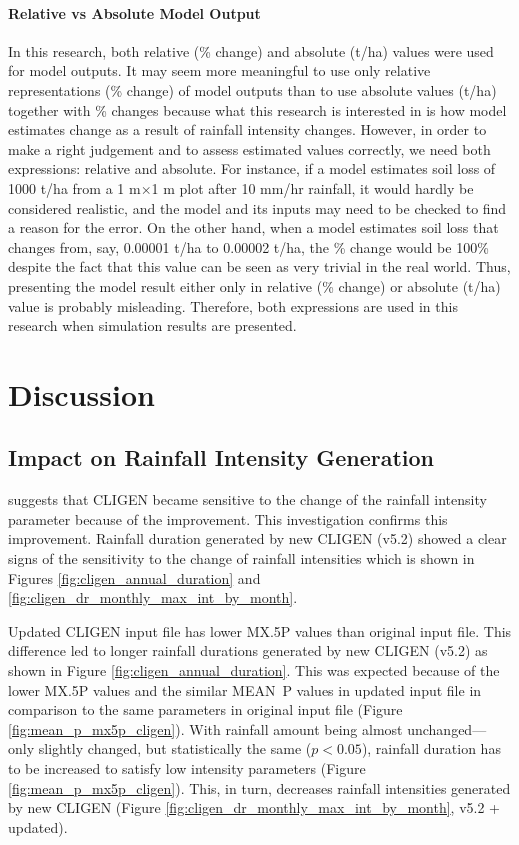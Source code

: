 \paragraph{Relative vs Absolute Model Output} In this research, both relative
(\% change) and absolute (t/ha) values were used for model outputs. It may seem
more meaningful to use only relative representations (\% change) of model
outputs than to use absolute values (t/ha) together with \% changes because what
this research is interested in is how model estimates change as a result of
rainfall intensity changes. However, in order to make a right judgement and to
assess estimated values correctly, we need both expressions: relative and
absolute. For instance, if a model estimates soil loss of 1000 t/ha from
a 1 m$\times$1 m plot after 10 mm/hr rainfall, it would hardly be considered
realistic, and the model and its inputs may need to be checked to find a reason
for the error. On the other hand, when a model estimates soil loss that changes
from, say, 0.00001 t/ha to 0.00002 t/ha, the \% change would be 100\% despite
the fact that this value can be seen as very trivial in the real world. Thus,
presenting the model result either only in relative (\% change) or absolute
(t/ha) value is probably misleading. Therefore, both expressions are used in
this research when simulation results are presented.

\section{Discussion}
\label{sec:ImprovedCLIGENDiscussion}

\subsection{Impact on Rainfall Intensity Generation}

\citet{yu2000-301} suggests that CLIGEN became sensitive to the change of the
rainfall intensity parameter because of the improvement. This investigation
confirms this improvement. Rainfall duration generated by new CLIGEN (v5.2)
showed a clear signs of the sensitivity to the change of rainfall intensities
which is shown in Figures \ref{fig:cligen_annual_duration} and
\ref{fig:cligen_dr_monthly_max_int_by_month}.

Updated CLIGEN input file has lower {MX.5P} values than original input file.
This difference led to longer rainfall durations generated by new CLIGEN (v5.2)
as shown in Figure \ref{fig:cligen_annual_duration}. This was expected because
of the lower {MX.5P} values and the similar MEAN~P values in updated input file
in comparison to the same parameters in original input file (Figure
\ref{fig:mean_p_mx5p_cligen}). With rainfall amount being almost
unchanged---only slightly changed, but statistically the same ($p<0.05$),
rainfall duration has to be increased to satisfy low intensity parameters
(Figure \ref{fig:mean_p_mx5p_cligen}). This, in turn, decreases rainfall
intensities generated by new CLIGEN (Figure
\ref{fig:cligen_dr_monthly_max_int_by_month}, v5.2 + updated).

